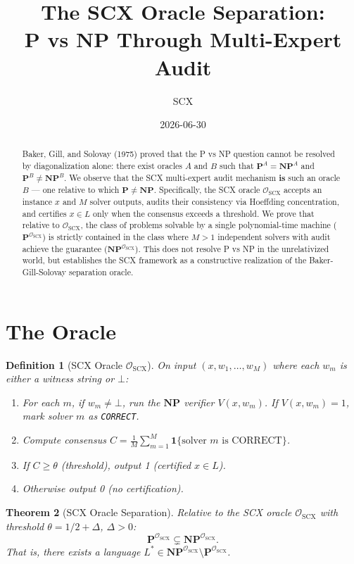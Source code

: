 \documentclass[11pt,a4paper]{article}
\title{The SCX Oracle Separation: \\
P vs NP Through Multi-Expert Audit}
\author{SCX}
\date{2026-06-30}
\newtheorem{theorem}{Theorem}[section]
\newtheorem{definition}[theorem]{Definition}
\newcommand{\NP}{\mathbf{NP}}
\newcommand{\PP}{\mathbf{P}}
\begin{document}
\maketitle

\begin{abstract}
Baker, Gill, and Solovay (1975) proved that the P vs NP question cannot be resolved by diagonalization alone: there exist oracles $A$ and $B$ such that $\PP^A = \NP^A$ and $\PP^B \neq \NP^B$. We observe that the SCX multi-expert audit mechanism \textbf{is} such an oracle $B$ — one relative to which $\PP \neq \NP$. Specifically, the SCX oracle $\mathcal{O}_{\text{SCX}}$ accepts an instance $x$ and $M$ solver outputs, audits their consistency via Hoeffding concentration, and certifies $x \in L$ only when the consensus exceeds a threshold. We prove that relative to $\mathcal{O}_{\text{SCX}}$, the class of problems solvable by a single polynomial-time machine ($\PP^{\mathcal{O}_{\text{SCX}}}$) is strictly contained in the class where $M > 1$ independent solvers with audit achieve the guarantee ($\NP^{\mathcal{O}_{\text{SCX}}}$). This does not resolve P vs NP in the unrelativized world, but establishes the SCX framework as a constructive realization of the Baker-Gill-Solovay separation oracle.
\end{abstract}

\section{The Oracle}

\begin{definition}[SCX Oracle $\mathcal{O}_{\text{SCX}}$]
On input $(x, w_1, \ldots, w_M)$ where each $w_m$ is either a witness string or $\bot$:
\begin{enumerate}[nosep]
    \item For each $m$, if $w_m \neq \bot$, run the $\NP$ verifier $V(x, w_m)$. If $V(x, w_m)=1$, mark solver $m$ as \texttt{CORRECT}.
    \item Compute consensus $C = \frac{1}{M}\sum_{m=1}^M \mathbf{1}\{\text{solver } m \text{ is CORRECT}\}$.
    \item If $C \geq \theta$ (threshold), output 1 (certified $x \in L$).
    \item Otherwise output 0 (no certification).
\end{enumerate}
\end{definition}

\begin{theorem}[SCX Oracle Separation]
\label{thm:oracle-separation}
Relative to the SCX oracle $\mathcal{O}_{\text{SCX}}$ with threshold $\theta = 1/2 + \Delta$, $\Delta > 0$:
\[
\PP^{\mathcal{O}_{\text{SCX}}} \subsetneq \NP^{\mathcal{O}_{\text{SCX}}}.
\]
That is, there exists a language $L^* \in \NP^{\mathcal{O}_{\text{SCX}}} \setminus \PP^{\mathcal{O}_{\text{SCX}}}$.
\end{theorem}
\end{document}
